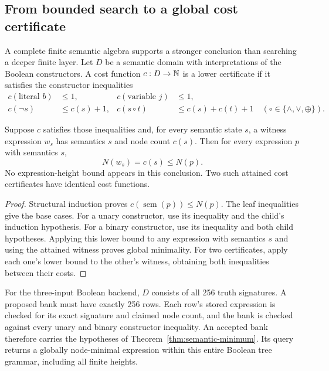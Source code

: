 \subsection{From bounded search to a global cost certificate}

A complete finite semantic algebra supports a stronger conclusion than searching a deeper finite layer. Let $D$ be a semantic domain with interpretations of the Boolean constructors. A cost function $c:D\to\mathbb N$ is a lower certificate if it satisfies the constructor inequalities
\begin{align*}
 c(\text{literal }b)&\le1,& c(\text{variable }j)&\le1,\\
 c(\neg s)&\le c(s)+1,&
 c(s\mathbin{\circ}t)&\le c(s)+c(t)+1
 \quad(\circ\in\{\wedge,\vee,\oplus\}).
\end{align*}

\begin{theorem}
\label{thm:semantic-minimum}
Suppose $c$ satisfies those inequalities and, for every semantic state $s$, a witness expression $w_s$ has semantics $s$ and node count $c(s)$. Then for every expression $p$ with semantics $s$,
\[
 N(w_s)=c(s)\le N(p).
\]
No expression-height bound appears in this conclusion. Two such attained cost certificates have identical cost functions.
\end{theorem}
\begin{proof}
Structural induction proves $c(\operatorname{sem}(p))\le N(p)$. The leaf inequalities give the base cases. For a unary constructor, use its inequality and the child's induction hypothesis. For a binary constructor, use its inequality and both child hypotheses. Applying this lower bound to any expression with semantics $s$ and using the attained witness proves global minimality. For two certificates, apply each one's lower bound to the other's witness, obtaining both inequalities between their costs.
\end{proof}

For the three-input Boolean backend, $D$ consists of all 256 truth signatures. A proposed bank must have exactly 256 rows. Each row's stored expression is checked for its exact signature and claimed node count, and the bank is checked against every unary and binary constructor inequality. An accepted bank therefore carries the hypotheses of Theorem~\ref{thm:semantic-minimum}. Its query returns a globally node-minimal expression within this entire Boolean tree grammar, including all finite heights.


